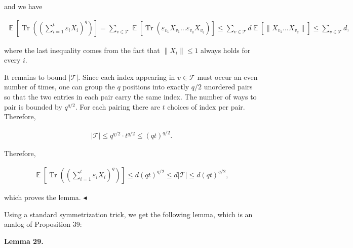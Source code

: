 \documentclass[10pt,a4paper]{article}
\begin{document}
and we have\par


\[\begin{gathered}
\operatorname*{\mathbb{E}}\left[\operatorname*{Tr}\left(\left(\sum_{i=1}^{t}\varepsilon_{i}X_{i}\right)^{q}\right)\right]=\sum_{v\in\mathcal{T}}\operatorname*{\mathbb{E}}\left[\operatorname*{Tr}(\varepsilon_{v_{1}}X_{v_{1}}\dots\varepsilon_{v_{q}}X_{v_{q}})\right]\leq\sum_{v\in\mathcal{T}}d\operatorname*{\mathbb{E}}\left[\|X_{v_{1}}\dots X_{v_{q}}\|\right]\leq\sum_{v\in\mathcal{T}}d,
\end{gathered}\]


where the last inequality comes from the fact that $\|X_{i}\|\leq 1$ always holds for every $i$.\par




It remains to bound $|\mathcal{T}|$.
Since each index appearing in $v\in\mathcal{T}$ must occur an even number of times, one can group the $q$ positions into exactly $q/2$ unordered pairs so that the two entries in each pair carry the same index.
The number of ways to pair is bounded by $q^{q/2}$.
For each pairing there are $t$ choices of index per pair. Therefore,\par


\[\begin{gathered}
|\mathcal{T}|\leq q^{q/2}\cdot t^{q/2}\leq(qt)^{q/2}.
\end{gathered}\]




Therefore,\par


\[\begin{gathered}
\operatorname*{\mathbb{E}}\left[\operatorname*{Tr}\left(\left(\sum_{i=1}^{t}\varepsilon_{i}X_{i}\right)^{q}\right)\right]\leq d(qt)^{q/2}\leq d|\mathcal{T}|\leq d(qt)^{q/2},
\end{gathered}\]


which proves the lemma.
$\blacktriangleleft$\par




Using a standard symmetrization trick, we get the following lemma, which is an analog of Proposition 39:\par





\par\medskip\noindent\textbf{
\textbf{Lemma 29}\textbf{.}
}\par
\end{document}
